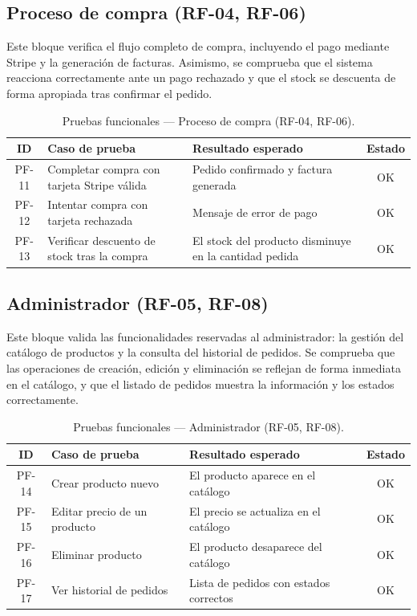 \subsection{Proceso de compra (RF-04, RF-06)}

Este bloque verifica el flujo completo de compra, incluyendo el pago mediante Stripe y la generación de facturas. Asimismo, se comprueba que el sistema reacciona correctamente ante un pago rechazado y que el stock se descuenta de forma apropiada tras confirmar el pedido.

\begin{table}[H]
\centering
\begin{tabular}{|c|L{5.5cm}|L{6cm}|c|}
\hline
\textbf{ID} & \textbf{Caso de prueba} & \textbf{Resultado esperado} & \textbf{Estado} \\
\hline
PF-11 & Completar compra con tarjeta Stripe válida & Pedido confirmado y factura generada & OK \\
\hline
PF-12 & Intentar compra con tarjeta rechazada & Mensaje de error de pago & OK \\
\hline
PF-13 & Verificar descuento de stock tras la compra & El stock del producto disminuye en la cantidad pedida & OK \\
\hline
\end{tabular}
\caption{Pruebas funcionales — Proceso de compra (RF-04, RF-06).}
\label{tab:pf-rf04-06}
\end{table}

\subsection{Administrador (RF-05, RF-08)}

Este bloque valida las funcionalidades reservadas al administrador: la gestión del catálogo de productos y la consulta del historial de pedidos. Se comprueba que las operaciones de creación, edición y eliminación se reflejan de forma inmediata en el catálogo, y que el listado de pedidos muestra la información y los estados correctamente.

\begin{table}[H]
\centering
\begin{tabular}{|c|L{5.5cm}|L{6cm}|c|}
\hline
\textbf{ID} & \textbf{Caso de prueba} & \textbf{Resultado esperado} & \textbf{Estado} \\
\hline
PF-14 & Crear producto nuevo & El producto aparece en el catálogo & OK \\
\hline
PF-15 & Editar precio de un producto & El precio se actualiza en el catálogo & OK \\
\hline
PF-16 & Eliminar producto & El producto desaparece del catálogo & OK \\
\hline
PF-17 & Ver historial de pedidos & Lista de pedidos con estados correctos & OK \\
\hline
\end{tabular}
\caption{Pruebas funcionales — Administrador (RF-05, RF-08).}
\label{tab:pf-rf05-08}
\end{table}

